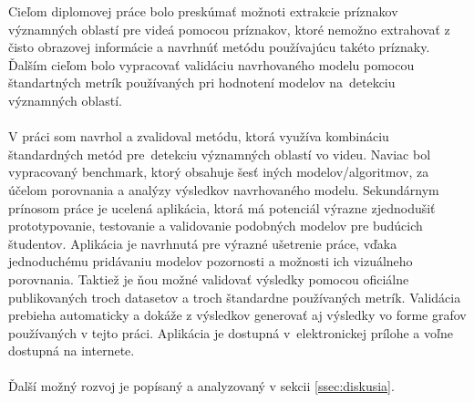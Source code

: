Cieľom diplomovej práce bolo preskúmať možnoti extrakcie príznakov významných oblastí pre videá pomocou príznakov, ktoré nemožno extrahovať z čisto obrazovej informácie a navrhnúť metódu používajúcu takéto príznaky.
Ďalším cieľom bolo vypracovať validáciu navrhovaného modelu pomocou štandartných metrík používaných pri hodnotení modelov na~detekciu významných oblastí.
\\
\\
V práci som navrhol a zvalidoval metódu, ktorá využíva kombináciu štandardných metód pre~detekciu významných oblastí vo videu.
Naviac bol vypracovaný benchmark, ktorý obsahuje šesť iných modelov/algoritmov, za účelom porovnania a analýzy výsledkov navrhovaného modelu.
Sekundárnym prínosom práce je ucelená aplikácia, ktorá má potenciál výrazne zjednodušiť prototypovanie, testovanie a validovanie podobných modelov pre budúcich študentov.
Aplikácia je navrhnutá pre výrazné ušetrenie práce, vďaka jednoduchému pridávaniu modelov pozornosti a možnosti ich vizuálneho porovnania.
Taktiež je ňou možné validovať výsledky pomocou oficiálne publikovaných troch datasetov a troch štandardne používaných metrík.
Validácia prebieha automaticky a dokáže z výsledkov generovať aj výsledky vo forme grafov používaných v tejto práci.
Aplikácia je dostupná v~elektronickej prílohe a voľne dostupná na internete.
\\
\\
Ďalší možný rozvoj je popísaný a analyzovaný v sekcii \ref{ssec:diskusia}.
